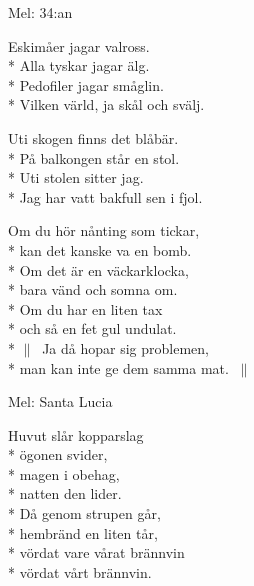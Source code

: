 \begin{SongText}[Bakfyllosofen]
\begin{SongInfo}
    Mel: 34:an
\end{SongInfo}
\begin{SongVerse}
Eskimåer jagar valross.\\*%
Alla tyskar jagar älg.\\*%
Pedofiler jagar småglin.\\*%
Vilken värld, ja skål och svälj.
\end{SongVerse}
\begin{SongVerse}
Uti skogen finns det blåbär.\\*%
På balkongen står en stol.\\*%
Uti stolen sitter jag.\\*%
Jag har vatt bakfull sen i fjol.
\end{SongVerse}
\begin{SongVerse}
Om du hör nånting som tickar,\\*%
kan det kanske va en bomb.\\*%
Om det är en väckarklocka,\\*%
bara vänd och somna om.\\*%
Om du har en liten tax\\*%
och så en fet gul undulat.\\*%
$\|\:$ Ja då hopar sig problemen,\\*%
man kan inte ge dem samma mat. $\:\|$
\end{SongVerse}
\end{SongText}
\begin{SongText}
\begin{SongInfo}
    Mel: Santa Lucia
\end{SongInfo}
\begin{SongVerse}
Huvut slår kopparslag\\*%
ögonen svider,\\*%
magen i obehag,\\*%
natten den lider.\\*%
Då genom strupen går,\\*%
hembränd en liten tår,\\*%
vördat vare vårat brännvin\\*%
vördat vårt brännvin.
\end{SongVerse}
\end{SongText}
